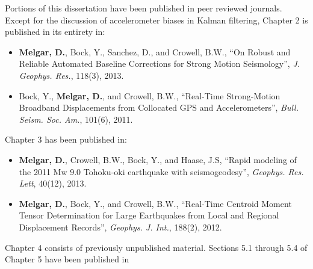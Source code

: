 \begin{frontmatter}
% 


%
\tableofcontents
\listoffigures  %
\listoftables   %



%
%
\begin{acknowledgements} 
Portions of this dissertation have been published in peer reviewed journals. Except for the discussion of accelerometer biases in Kalman filtering, Chapter 2 is published in its entirety in:
\begin{itemize}
\item \textbf{Melgar, D.}, Bock, Y., Sanchez, D., and Crowell, B.W., ``On Robust and Reliable Automated Baseline Corrections for Strong Motion Seismology'', \emph{J. Geophys. Res.}, 118(3), 2013.
\item Bock, Y., \textbf{Melgar, D.}, and Crowell, B.W., ``Real-Time Strong-Motion Broadband Displacements from Collocated GPS and Accelerometers'', \emph{Bull. Seism. Soc. Am.}, 101(6), 2011.
\end{itemize}
Chapter 3 has been published in:
\begin{itemize}
\item \textbf{Melgar, D.}, Crowell, B.W., Bock, Y., and Haase, J.S, ``Rapid modeling of the 2011 Mw 9.0 Tohoku-oki earthquake with seismogeodesy'', \emph{Geophys. Res. Lett}, 40(12), 2013.
\item \textbf{Melgar, D.}, Bock, Y., and Crowell, B.W., ``Real-Time Centroid Moment Tensor Determination for Large Earthquakes from Local and Regional Displacement Records'', \emph{Geophys. J. Int.}, 188(2), 2012.
\end{itemize}
Chapter 4 consists of previously unpublished material. Sections 5.1 through 5.4 of Chapter 5 have been published in
\begin{itemize}

\end{itemize}
\end{acknowledgements}
\end{frontmatter}
